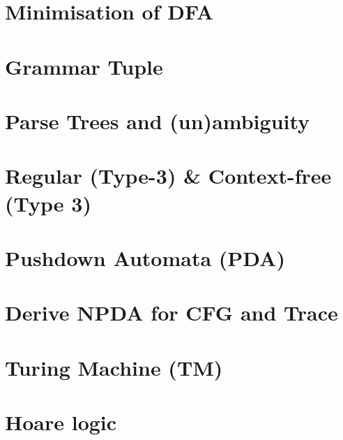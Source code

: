 \documentclass[10pt,a4paper,landscape]{article}
\begin{document}
\begin{multicols*}{3}
\section*{Minimisation of DFA}


\section*{Grammar Tuple}


\section*{Parse Trees and (un)ambiguity}


\section*{Regular (Type-3) \& Context-free (Type 3)}


\section*{Pushdown Automata (PDA)}


\section*{Derive NPDA for CFG and Trace}


\section*{Turing Machine (TM)}



\section*{Hoare logic}


\end{multicols*}
\end{document}
